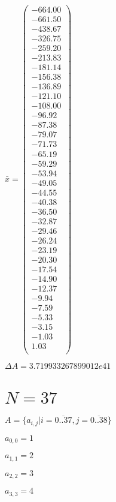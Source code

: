 \documentclass[a4paper,12pt]{article}
\begin{document}
$\bar { x } = \begin{pmatrix}
-664.00 \\
-661.50 \\
-438.67 \\
-326.75 \\
-259.20 \\
-213.83 \\
-181.14 \\
-156.38 \\
-136.89 \\
-121.10 \\
-108.00 \\
-96.92 \\
-87.38 \\
-79.07 \\
-71.73 \\
-65.19 \\
-59.29 \\
-53.94 \\
-49.05 \\
-44.55 \\
-40.38 \\
-36.50 \\
-32.87 \\
-29.46 \\
-26.24 \\
-23.19 \\
-20.30 \\
-17.54 \\
-14.90 \\
-12.37 \\
-9.94 \\
-7.59 \\
-5.33 \\
-3.15 \\
-1.03 \\
1.03 \\
\end{pmatrix}
$

$\Delta A = 3.719933267899012e41$



\section{ $N = 37$ }
$A = \{ a _{ i, j } | i = \overline { 0..37 }, j = \overline { 0..38 } \}$

$a _{ 0, 0 } = 1$

$a _{ 1, 1 } = 2$

$a _{ 2, 2 } = 3$

$a _{ 3, 3 } = 4$
\end{document}

